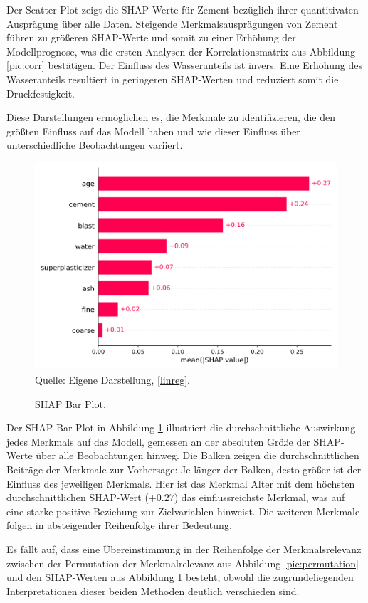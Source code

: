 Der Scatter Plot zeigt die SHAP-Werte für Zement bezüglich ihrer quantitivaten Ausprägung über alle 
Daten. Steigende Merkmalsausprägungen von Zement führen zu größeren SHAP-Werte und somit zu einer Erhöhung der 
Modellprognose, was die ersten Analysen der Korrelationsmatrix aus Abbildung \ref{pic:corr} bestätigen. Der Einfluss des Wasseranteils
ist invers. Eine Erhöhung des Wasseranteils resultiert in geringeren SHAP-Werten und reduziert somit die 
Druckfestigkeit. 

Diese Darstellungen ermöglichen es, die Merkmale zu identifizieren, 
die den größten Einfluss auf das Modell haben und wie dieser Einfluss über 
unterschiedliche Beobachtungen variiert.

\begin{figure}[!h]
    \caption{SHAP Bar Plot.}
    \includegraphics[width=1\textwidth]{../scripts/images/shap_bar_plot.png}
    Quelle: Eigene Darstellung, \ref{linreg}.
    \label{pic:shap_bar}
\end{figure}

Der SHAP Bar Plot in Abbildung \ref{pic:shap_bar} illustriert die durchschnittliche 
Auswirkung jedes Merkmals auf das Modell, gemessen an der absoluten Größe der SHAP-Werte 
über alle Beobachtungen hinweg. Die Balken zeigen die durchschnittlichen Beiträge der 
Merkmale zur Vorhersage: Je länger der Balken, desto größer ist der Einfluss des jeweiligen Merkmals. 
Hier ist das Merkmal Alter mit dem höchsten durchschnittlichen SHAP-Wert ($+0.27$) das einflussreichste 
Merkmal, was auf eine starke positive Beziehung zur Zielvariablen hinweist. Die weiteren Merkmale 
folgen in absteigender Reihenfolge ihrer Bedeutung.

Es fällt auf, dass eine Übereinstimmung in der Reihenfolge der Merkmalsrelevanz zwischen 
der Permutation der Merkmalrelevanz aus Abbildung \ref{pic:permutation} und den SHAP-Werten aus Abbildung \ref{pic:shap_bar}
besteht, obwohl die zugrundeliegenden Interpretationen dieser beiden Methoden deutlich verschieden sind. 

